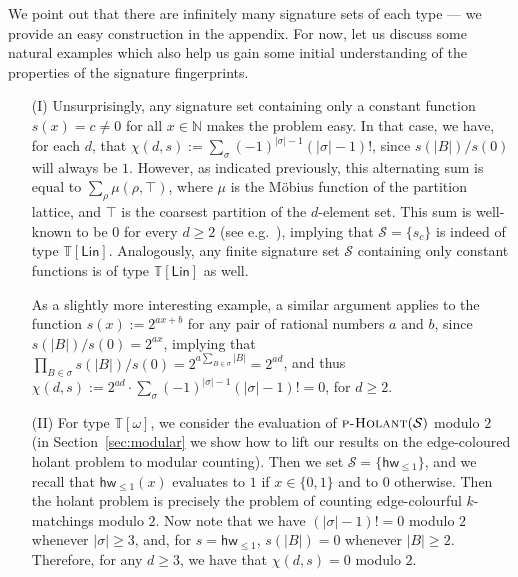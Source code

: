 \documentclass[authorcolumns,numberwithinsect]{no-lipics-v2022}
\newcommand{\holantprob}{\text{\sc{p-Holant}}}
\begin{document}
We point out that there are infinitely many signature sets of each type --- we provide an easy construction in the appendix. For now, let us discuss some natural examples which also help us gain some initial understanding of the properties of the signature fingerprints.
\begin{itemize}
    \item[(I)] Unsurprisingly, any signature set containing only a constant function $s(x)=c\neq 0$ for all $x\in \mathbb{N}$ makes the problem easy.  In that case, we have, for each $d$, that
    $\chi(d,s) := \sum_{\sigma} (-1)^{|\sigma|-1} (|\sigma|-1)!$, since $s(|B|)/s(0)$ will always be $1$. However, as indicated previously, this alternating sum is equal to $\sum_{\rho}\mu(\rho,\top)$, where $\mu$ is the M\"obius function of the partition lattice, and $\top$ is the coarsest partition of the $d$-element set. This sum is well-known to be $0$ for every $d\geq 2$ (see e.g.\ \cite[Section~3.7]{Stanley11}), implying that $\mathcal{S}=\{s_c\}$ is indeed of type $\mathbb{T}[\mathsf{Lin}]$. Analogously, any finite signature set $\mathcal{S}$ containing only constant functions is of type $\mathbb{T}[\mathsf{Lin}]$ as well.

    As a slightly more interesting example, a similar argument applies to the function $s(x):= 2^{ax+b}$ for any pair of rational numbers $a$ and $b$, since $s(|B|)/s(0)= 2^{ax}$, implying that $\prod_{B\in \sigma} s(|B|)/s(0) = 2^{a\sum_{B\in \sigma}|B|} = 2^{ad}$, and thus $\chi(d,s) := 2^{ad} \cdot \sum_{\sigma} (-1)^{|\sigma|-1} (|\sigma|-1)! =0$, for $d \geq 2$.
    \item[(II)] For type $\mathbb{T}[\mathsf{\omega}]$, we consider the evaluation of $\holantprob(\mathcal{S})$ modulo $2$ (in Section~\ref{sec:modular} we show how to lift our results on the edge-coloured holant problem to modular counting). Then we set $\mathcal{S}=\{\mathsf{hw}_{\leq 1}\}$, and we recall that $\mathsf{hw}_{\leq 1}(x)$ evaluates to $1$ if $x\in \{0,1\}$ and to $0$ otherwise. Then the holant problem is precisely the problem of counting edge-colourful $k$-matchings modulo $2$. Now note that we have $(|\sigma|-1)!=0$ modulo $2$ whenever $|\sigma| \geq 3$, and, for $s=\mathsf{hw}_{\leq 1}$, $s(|B|)=0$ whenever $|B|\geq 2$. Therefore, for any $d\geq 3$, we have that $\chi(d,s)=0$ modulo $2$.


\end{itemize}
\end{document}
